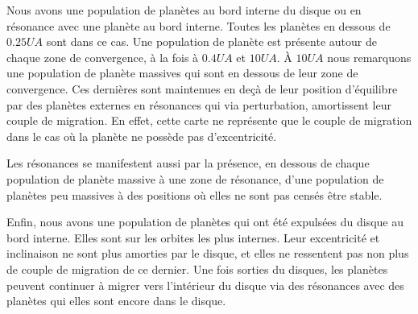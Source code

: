 Nous avons une population de planètes au bord interne du disque ou en résonance avec une planète au bord interne. Toutes les planètes en dessous de $0.25\unit{UA}$ sont dans ce cas. Une population de planète est présente autour de chaque zone de convergence, à la fois à $0.4\unit{UA}$ et $10\unit{UA}$. À $10\unit{UA}$ nous remarquons une population de planète massives qui sont en dessous de leur zone de convergence. Ces dernières sont maintenues en deçà de leur position d'équilibre par des planètes externes en résonances qui via perturbation, amortissent leur couple de migration. En effet, cette carte ne représente que le couple de migration dans le cas où la planète ne possède pas d'excentricité. 

Les résonances se manifestent aussi par la présence, en dessous de chaque population de planète massive à une zone de résonance, d'une population de planètes peu massives à des positions où elles ne sont pas censés être stable. 

Enfin, nous avons une population de planètes qui ont été expulsées du disque au bord interne. Elles sont sur les orbites les plus internes. Leur excentricité et inclinaison ne sont plus amorties par le disque, et elles ne ressentent pas non plus de couple de migration de ce dernier. Une fois sorties du disques, les planètes peuvent continuer à migrer vers l'intérieur du disque via des résonances avec des planètes qui elles sont encore dans le disque. 

